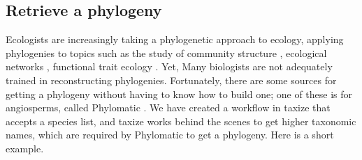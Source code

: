 \documentclass[letterpaper,superscriptaddress,showkeys,longbibliography,10pt]{revtex4-1}\usepackage{graphicx, color}
\begin{document}
\subsection{Retrieve a phylogeny}

Ecologists are increasingly taking a phylogenetic approach to ecology, applying phylogenies to topics such as the study of community structure \cite{REF}, ecological networks \cite{REF}, functional trait ecology \cite{REF}. Yet, Many biologists are not adequately trained in reconstructing phylogenies. Fortunately, there are some sources for getting a phylogeny without having to know how to build one; one of these is for angiosperms, called Phylomatic \cite{webb2005}. We have created a workflow in taxize that accepts a species list, and taxize works behind the scenes to get higher taxonomic names, which are required by Phylomatic to get a phylogeny. Here is a short example. 
\end{document}
